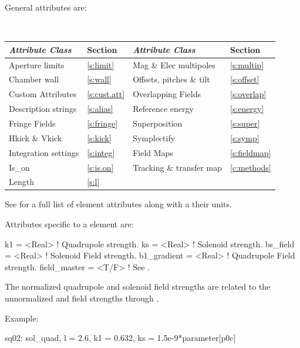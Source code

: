 {General  attributes are:
\begin{center}
\tt
\begin{tabular}{llll} \toprule
  {\sl Attribute Class}      & Section           & {\sl Attribute Class}      & Section            \\ \midrule
  Aperture limits            & \ref{s:limit}     & Mag \& Elec multipoles     & \ref{s:multip}     \\
  Chamber wall               & \ref{s:wall}      & Offsets, pitches \& tilt   & \ref{s:offset}     \\
  Custom Attributes          & \ref{s:cust.att}  & Overlapping Fields         & \ref{s:overlap}    \\
  Description strings        & \ref{s:alias}     & Reference energy           & \ref{s:energy}     \\ 
  Fringe Fields              & \ref{s:fringe}    & Superposition              & \ref{s:super}      \\
  Hkick \& Vkick             & \ref{s:kick}      & Symplectify                & \ref{s:symp}       \\
  Integration settings       & \ref{s:integ}     & Field Maps                 & \ref{s:fieldmap}   \\
  Is_on                      & \ref{s:is.on}     & Tracking \& transfer map   & \ref{c:methods}    \\ 
  Length                     & \ref{s:l}         &                            &                    \\ 
  \bottomrule
\end{tabular}
\end{center}
\toffset
See  for a full list of element attributes along with a their units.

Attributes specific to a  element are:
\begin{example}
  k1           = <Real>    ! Quadrupole strength.
  ks           = <Real>    ! Solenoid strength.
  bs_field     = <Real>    ! Solenoid Field strength.
  b1_gradient  = <Real>    ! Quadrupole Field strength.
  field_master = <T/F>     ! See .
\end{example}
The normalized quadrupole  and solenoid  field strengths are related to the
unnormalized  and  field strengths through .

Example:
\begin{example}
  sq02: sol_quad, l = 2.6, k1 = 0.632, ks = 1.5e-9*parameter[p0c]
\end{example}

}
